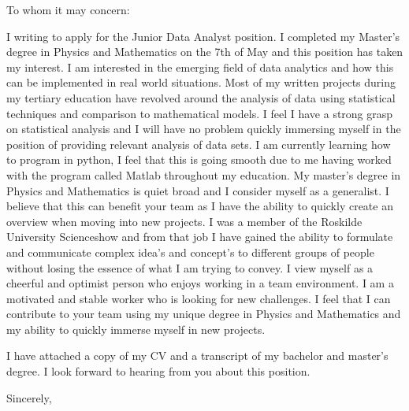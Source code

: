 \documentclass[10pt,a4paper]{letter}
\begin{document}
\begin{letter}{}
\opening{To whom it may concern:}

I writing to apply for the Junior Data Analyst position. I completed my Master's degree in Physics and Mathematics on the 7th of May and this position has taken my interest. I am interested in the emerging field of data analytics and how this can be implemented in real world situations. Most of my written projects during my tertiary education have revolved around the analysis of data using statistical techniques and comparison to mathematical models. I feel I have a strong grasp on statistical analysis and I will have no problem quickly immersing myself in the position of providing relevant analysis of data sets. I am currently learning how to program in python, I feel that this is going smooth due to me having worked with the program called Matlab throughout my education. My master's degree in Physics and Mathematics is quiet broad and I consider myself as a generalist. I believe that this can benefit your team as I have the ability to quickly create an overview when moving into new projects. I was a member of the Roskilde University Scienceshow and from that job I have gained the ability to formulate and communicate complex idea's and concept's to different groups of people without losing the essence of what I am trying to convey.  I view myself as a cheerful and optimist person who enjoys working in a team environment. I am a motivated and stable worker who is looking for new challenges. I feel that I can contribute to your team using my unique degree in Physics and Mathematics and my ability to quickly immerse myself in new projects. 

I have attached a copy of my CV and a transcript of my bachelor and master's degree. I look forward to hearing from you about this position.   

\closing{Sincerely,}

\end{letter}

\end{document}
